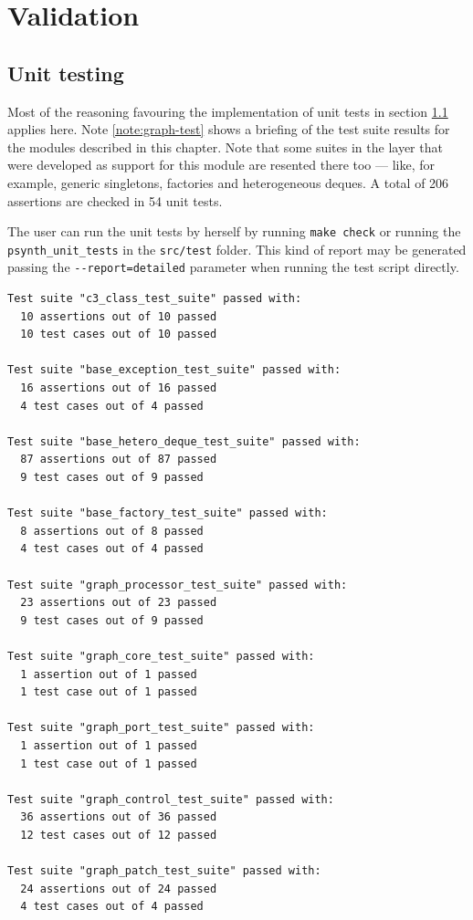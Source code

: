 \section{Validation}

\subsection{Unit testing}
\label{sec:sound-unittest}

Most of the reasoning favouring the implementation of unit tests in
section \ref{sec:sound-unittest} applies here. Note
\ref{note:graph-test} shows a briefing of the test suite results for
the modules described in this chapter. Note that some suites in the
 layer that were developed as support for this module are
resented there too --- like, for example, generic singletons,
factories and heterogeneous deques. A total of 206 assertions are
checked in 54 unit tests.

\begin{mynote}
\label{note:graph-test}
The user can run the unit tests by herself by running \texttt{make
  check} or running the \texttt{psynth\_unit\_tests} in the
\texttt{src/test} folder. This kind of report may be generated passing
the \verb|--report=detailed| parameter when running the test script
directly.  {\small
\begin{verbatim}
Test suite "c3_class_test_suite" passed with:
  10 assertions out of 10 passed
  10 test cases out of 10 passed

Test suite "base_exception_test_suite" passed with:
  16 assertions out of 16 passed
  4 test cases out of 4 passed

Test suite "base_hetero_deque_test_suite" passed with:
  87 assertions out of 87 passed
  9 test cases out of 9 passed

Test suite "base_factory_test_suite" passed with:
  8 assertions out of 8 passed
  4 test cases out of 4 passed

Test suite "graph_processor_test_suite" passed with:
  23 assertions out of 23 passed
  9 test cases out of 9 passed

Test suite "graph_core_test_suite" passed with:
  1 assertion out of 1 passed
  1 test case out of 1 passed

Test suite "graph_port_test_suite" passed with:
  1 assertion out of 1 passed
  1 test case out of 1 passed

Test suite "graph_control_test_suite" passed with:
  36 assertions out of 36 passed
  12 test cases out of 12 passed

Test suite "graph_patch_test_suite" passed with:
  24 assertions out of 24 passed
  4 test cases out of 4 passed
\end{verbatim}
}
\end{mynote}

